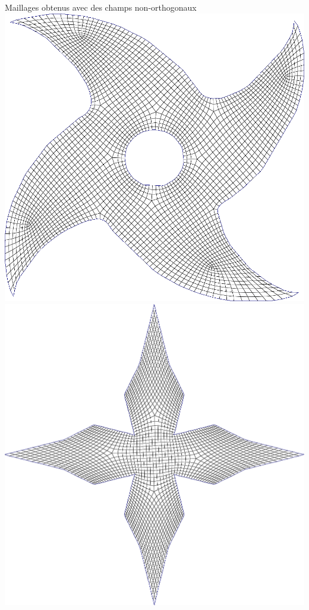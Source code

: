 \begin{frame}{Maillages obtenus avec des champs non-orthogonaux}
    \centering
    \includegraphics[width=.49\textwidth]{img/spmff/shuriken_nonortho}
    \includegraphics[width=.49\textwidth]{img/spmff/shuriken_center_singu}
\end{frame}
